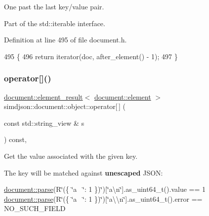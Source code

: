 One past the last key/value pair. 

Part of the std\+::iterable interface. 

Definition at line 495 of file document.\+h.


\begin{DoxyCode}
495                                                                  \{
496   \textcolor{keywordflow}{return} iterator(doc, after\_element() - 1);
497 \}
\end{DoxyCode}
\mbox{\label{classsimdjson_1_1document_1_1object_a5b52e82f66a45fb9a669a643aabf60ae}} 
\subsubsection{\texorpdfstring{operator[]()}{operator[]()}\hspace{0.1cm}{\footnotesize\ttfamily [1/2]}}
{\footnotesize\ttfamily \hyperlink{classsimdjson_1_1document_1_1element__result}{document\+::element\+\_\+result}$<$ \hyperlink{classsimdjson_1_1document_1_1element}{document\+::element} $>$ simdjson\+::document\+::object\+::operator\mbox{[}$\,$\mbox{]} (\begin{DoxyParamCaption}\item[{const std\+::string\+\_\+view \&}]{s }\end{DoxyParamCaption}) const\hspace{0.3cm}{\ttfamily [inline]}, {\ttfamily [noexcept]}}



Get the value associated with the given key. 

The key will be matched against {\bfseries unescaped} J\+S\+ON\+:

\hyperlink{classsimdjson_1_1document_a6f11cda7c4a06fffdc00fdc97d98ae2b}{document\+::parse}(R\char`\"{}(\{ \char`\"{}a~\newline
\char`\"{}\+: 1 \})\char`\"{})\mbox{[}\char`\"{}a\textbackslash{}n\char`\"{}\mbox{]}.as\+\_\+uint64\+\_\+t().value == 1 \hyperlink{classsimdjson_1_1document_a6f11cda7c4a06fffdc00fdc97d98ae2b}{document\+::parse}(R\char`\"{}(\{ \char`\"{}a~\newline
\char`\"{}\+: 1 \})\char`\"{})\mbox{[}\char`\"{}a\textbackslash{}\textbackslash{}n\char`\"{}\mbox{]}.as\+\_\+uint64\+\_\+t().error == N\+O\+\_\+\+S\+U\+C\+H\+\_\+\+F\+I\+E\+LD


